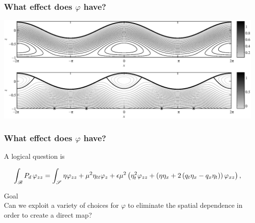 \begin{frame}\frametitle{What effect does \(\varphi\) have?}
\begin{center}
    \includegraphics[width=.9\textwidth]{images/const_vorticity_pressure_streamline_contour_gamma_3.eps}
\end{center}
\end{frame}



\begin{frame}[t]\frametitle{What effect does \(\varphi\) have?}
    A logical question is     
    
    \[\int_{\mathscr{B}} P_d\,\varphi_{zz} = \int_{\mathscr{S}}\eta\varphi_{zz} + \mu^2\eta_{tt}\varphi_z + \epsilon\mu^2\left(\eta_t^2\varphi_{zz} + \left(\eta\eta_x + 2\left(q_t\eta_x - q_x\eta_t\right)\right)\varphi_{xz}\right),\]
    \vspace*{.5in}
    \begin{block}{\Large{Goal}}
            ~\\Can we exploit a variety of choices for \(\varphi\) to eliminate the spatial dependence in order to create a direct  map?\\~\\
        \end{block}
\end{frame}

